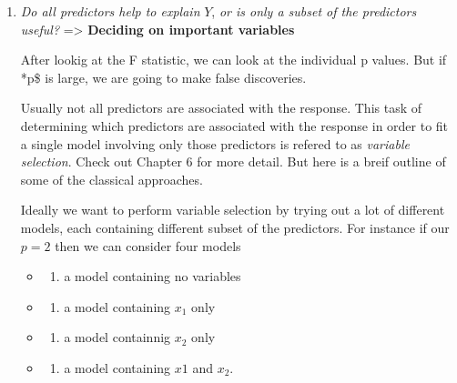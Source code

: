 \documentclass[
  letterpaper,
  DIV=11,
  numbers=noendperiod]{scrreprt}
\providecommand{\tightlist}{%
  \setlength{\itemsep}{0pt}\setlength{\parskip}{0pt}}\usepackage{longtable,booktabs,array}
\begin{document}
\begin{enumerate}
\def\labelenumi{\arabic{enumi}.}
\setcounter{enumi}{1}
\item
  \emph{Do all predictors help to explain} \(Y\), \emph{or is only a
  subset of the predictors useful?} =\textgreater{} \textbf{Deciding on
  important variables}

  After lookig at the F statistic, we can look at the individual p
  values. But if *p\$ is large, we are going to make false discoveries.

  Usually not all predictors are associated with the response. This task
  of determining which predictors are associated with the response in
  order to fit a single model involving only those predictors is refered
  to as \emph{variable selection}. Check out Chapter 6 for more detail.
  But here is a breif outline of some of the classical approaches.

  Ideally we want to perform variable selection by trying out a lot of
  different models, each containing different subset of the predictors.
  For instance if our \(p=2\) then we can consider four models

  \begin{itemize}
  \item
    \begin{enumerate}
    \def\labelenumii{(\arabic{enumii})}
    \tightlist
    \item
      a model containing no variables
    \end{enumerate}
  \item
    \begin{enumerate}
    \def\labelenumii{(\arabic{enumii})}
    \setcounter{enumii}{1}
    \tightlist
    \item
      a model containing \(x_1\) only
    \end{enumerate}
  \item
    \begin{enumerate}
    \def\labelenumii{(\arabic{enumii})}
    \setcounter{enumii}{2}
    \tightlist
    \item
      a model containnig \(x_2\) only
    \end{enumerate}
  \item
    \begin{enumerate}
    \def\labelenumii{(\arabic{enumii})}
    \setcounter{enumii}{3}
    \tightlist
    \item
      a model containing \(x1\) and \(x_2\).
    \end{enumerate}
  \end{itemize}


\end{enumerate}
\end{document}
